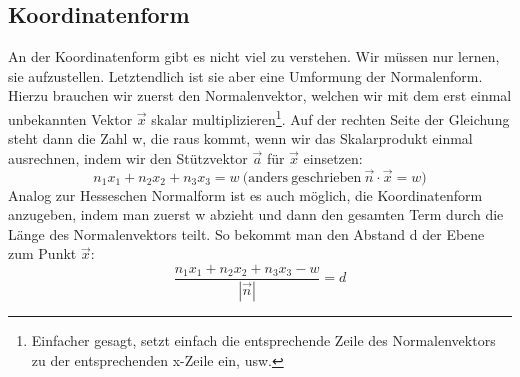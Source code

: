 \subsection{Koordinatenform}
An der Koordinatenform gibt es nicht viel zu verstehen. Wir müssen nur lernen, sie aufzustellen. Letztendlich ist sie aber eine Umformung der Normalenform. Hierzu brauchen wir zuerst den Normalenvektor, welchen wir mit dem erst einmal unbekannten Vektor \(\vec{x}\) skalar multiplizieren\footnote{Einfacher gesagt, setzt einfach die entsprechende Zeile des Normalenvektors zu der entsprechenden x-Zeile ein, usw.}. Auf der rechten Seite der Gleichung steht dann die Zahl w, die raus kommt, wenn wir das Skalarprodukt einmal ausrechnen, indem wir den Stützvektor \(\vec{a}\) für \(\vec{x}\) einsetzen:
\[n_1x_1+n_2x_2+n_3x_3=w \mathrm{\ (anders\ geschrieben\ } \vec{n}\cdot \vec{x}=w)\]
Analog zur Hesseschen Normalform ist es auch möglich, die Koordinatenform anzugeben, indem man zuerst w abzieht und dann den gesamten Term durch die Länge des Normalenvektors teilt. So bekommt man den Abstand d der Ebene zum Punkt \(\vec{x}\):
\[\frac{n_1x_1+n_2x_2+n_3x_3-w}{|\vec{n}|}=d\]
